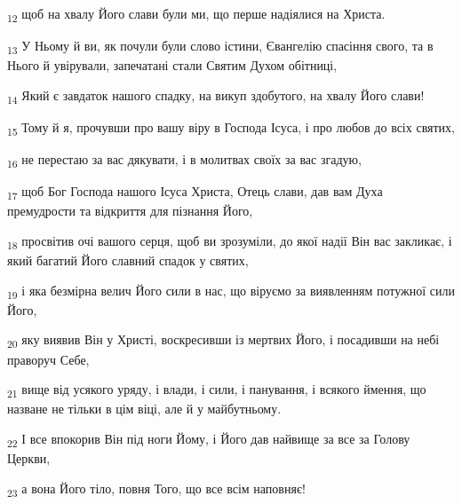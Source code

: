 \begin{tcolorbox}
\textsubscript{12} щоб на хвалу Його слави були ми, що перше надіялися на Христа.
\end{tcolorbox}
\begin{tcolorbox}
\textsubscript{13} У Ньому й ви, як почули були слово істини, Євангелію спасіння свого, та в Нього й увірували, запечатані стали Святим Духом обітниці,
\end{tcolorbox}
\begin{tcolorbox}
\textsubscript{14} Який є завдаток нашого спадку, на викуп здобутого, на хвалу Його слави!
\end{tcolorbox}
\begin{tcolorbox}
\textsubscript{15} Тому й я, прочувши про вашу віру в Господа Ісуса, і про любов до всіх святих,
\end{tcolorbox}
\begin{tcolorbox}
\textsubscript{16} не перестаю за вас дякувати, і в молитвах своїх за вас згадую,
\end{tcolorbox}
\begin{tcolorbox}
\textsubscript{17} щоб Бог Господа нашого Ісуса Христа, Отець слави, дав вам Духа премудрости та відкриття для пізнання Його,
\end{tcolorbox}
\begin{tcolorbox}
\textsubscript{18} просвітив очі вашого серця, щоб ви зрозуміли, до якої надії Він вас закликає, і який багатий Його славний спадок у святих,
\end{tcolorbox}
\begin{tcolorbox}
\textsubscript{19} і яка безмірна велич Його сили в нас, що віруємо за виявленням потужної сили Його,
\end{tcolorbox}
\begin{tcolorbox}
\textsubscript{20} яку виявив Він у Христі, воскресивши із мертвих Його, і посадивши на небі праворуч Себе,
\end{tcolorbox}
\begin{tcolorbox}
\textsubscript{21} вище від усякого уряду, і влади, і сили, і панування, і всякого ймення, що назване не тільки в цім віці, але й у майбутньому.
\end{tcolorbox}
\begin{tcolorbox}
\textsubscript{22} І все впокорив Він під ноги Йому, і Його дав найвище за все за Голову Церкви,
\end{tcolorbox}
\begin{tcolorbox}
\textsubscript{23} а вона Його тіло, повня Того, що все всім наповняє!
\end{tcolorbox}
